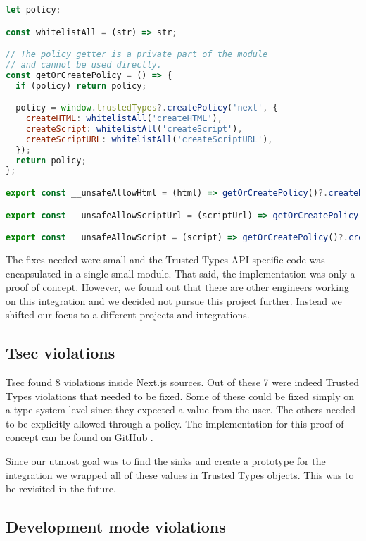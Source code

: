\bigskip
\begin{lstlisting}[language=JavaScript, caption=Example of Next.js Trusted Types API]
let policy;

const whitelistAll = (str) => str;

// The policy getter is a private part of the module
// and cannot be used directly.
const getOrCreatePolicy = () => {
  if (policy) return policy;

  policy = window.trustedTypes?.createPolicy('next', {
    createHTML: whitelistAll('createHTML'),
    createScript: whitelistAll('createScript'),
    createScriptURL: whitelistAll('createScriptURL'),
  });
  return policy;
};

export const __unsafeAllowHtml = (html) => getOrCreatePolicy()?.createHTML(html) ?? html;

export const __unsafeAllowScriptUrl = (scriptUrl) => getOrCreatePolicy()?.createScriptURL(scriptUrl) ?? scriptUrl;

export const __unsafeAllowScript = (script) => getOrCreatePolicy()?.createScript(script) ?? script;
\end{lstlisting}

The fixes needed were small and the Trusted Types API specific code was encapsulated in a single
small module. That said, the implementation was only a proof of concept. However, we found out that
there are other engineers working on this integration and we decided not pursue this project
further. Instead we shifted our focus to a different projects and integrations.

\subsection{Tsec violations}

Tsec found 8 violations \cite{tsec_output} inside Next.js sources. Out of these 7 were indeed
Trusted Types violations that needed to be fixed. Some of these could be fixed simply on a type
system level since they expected a value from the user. The others needed to be explicitly allowed
through a policy. The implementation for this proof of concept can be found on GitHub
\cite{nextjs_fix_tsec_violations_commit}.

Since our utmost goal was to find the sinks and create a prototype for the integration we wrapped
all of these values in Trusted Types objects. This was to be revisited in the future.

\subsection{Development mode violations}

